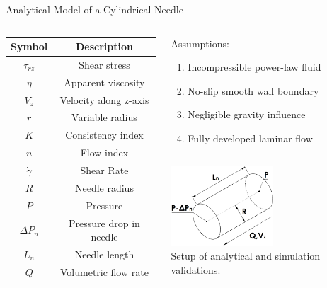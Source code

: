 \begin{frame}{Analytical Model of a Cylindrical Needle}

\small
\begin{columns}
\begin{column}{.4\textwidth}
\vspace{-0.5cm}
\begin{table}
\begin{tabular}{ c | c }
Symbol & Description \\
\hline \hline
$\tau_{rz}$ & Shear stress \\
$\eta$ & Apparent viscosity \\
$V_z$ &  Velocity along z-axis \\
$r$ & Variable radius \\
$K$ & Consistency index \\ 
$n$ & Flow index  \\
$\dot{\gamma}$ & Shear Rate  \\
$R$ & Needle radius \\
$P$ &  Pressure\\
$\Delta P_n$ &  Pressure drop in needle \\
$L_n$ & Needle length \\
$Q$ & Volumetric flow rate
\end{tabular}
\end{table}
\end{column}

\begin{column}{.6\textwidth}
\begin{column}{.4\textwidth}
\begin{block}{Assumptions:}
\begin{enumerate}[I]\setlength{\itemsep}{0.01mm}
[square]
    \item Incompressible power-law fluid
    \item No-slip smooth wall boundary
    \item Negligible gravity influence
    \item Fully developed laminar flow
\end{enumerate}
\end{block}
\end{column}
\begin{column}{.6\textwidth}
\centering
\includegraphics[trim = 0mm 0mm 0mm 0mm, clip, width=1.5in]{./images/math_model.png}\\\tiny Setup of analytical and simulation validations.


\end{column}
\end{column}
\end{columns}
\end{frame}
